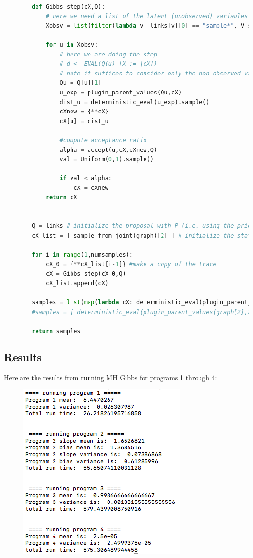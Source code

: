 \documentclass[12pt]{article}%
\theoremstyle{definition}
\newcommand{\cX}{{\mathcal X}}
\begin{document}
\begin{lstlisting}[language=Python]
	    
	    def Gibbs_step(cX,Q):
	        # here we need a list of the latent (unobserved) variables
	        Xobsv = list(filter(lambda v: links[v][0] == "sample*", V_sorted))
	
	        for u in Xobsv:
	            # here we are doing the step
	            # d <- EVAL(Q(u) [X := \cX]) 
	            # note it suffices to consider only the non-observed variables
	            Qu = Q[u][1]
	            u_exp = plugin_parent_values(Qu,cX)
	            dist_u = deterministic_eval(u_exp).sample()
	            cXnew = {**cX}
	            cX[u] = dist_u
	
	            #compute acceptance ratio
	            alpha = accept(u,cX,cXnew,Q)
	            val = Uniform(0,1).sample()
	
	            if val < alpha:
	                cX = cXnew
	        return cX
	
	
	    Q = links # initialize the proposal with P (i.e. using the prior)
	    cX_list = [ sample_from_joint(graph)[2] ] # initialize the state/trace
	
	    for i in range(1,numsamples):
	        cX_0 = {**cX_list[i-1]} #make a copy of the trace
	        cX = Gibbs_step(cX_0,Q)
	        cX_list.append(cX)
	    
	    samples = list(map(lambda cX: deterministic_eval(plugin_parent_values(graph[2], cX)), cX_list))
	    #samples = [ deterministic_eval(plugin_parent_values(graph[2],X)) for X in cX_list ]
	
	    return samples
	\end{lstlisting}
		
	\newpage
	
	
	\subsection{Results}
	
	Here are the results from running MH Gibbs for programs 1 through 4:
	\begin{figure}[h]
	\includegraphics[scale=0.7]{MH_Gibbs_results}
	\end{figure}
	
\end{document}
